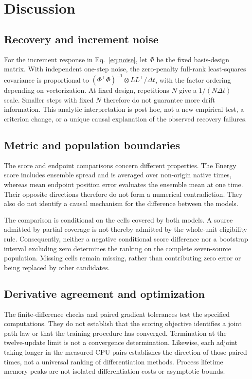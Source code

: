 \documentclass[11pt]{article}
\begin{document}
\section{Discussion}\label{sec:discussion}
\subsection{Recovery and increment noise}
For the increment response in Eq.~\eqref{eq:noise}, let $\Phi$ be the fixed basis-design matrix. With independent one-step noise, the zero-penalty full-rank least-squares covariance is proportional to
$(\Phi^\top\Phi)^{-1}\otimes LL^\top/\Delta t$, with the factor ordering depending on vectorization. At fixed design, repetitions $N$ give a $1/(N\Delta t)$ scale. Smaller steps with fixed $N$ therefore do not guarantee more drift information. This analytic interpretation is post hoc, not a new empirical test, a criterion change, or a unique causal explanation of the observed recovery failures.

\subsection{Metric and population boundaries}
The score and endpoint comparisons concern different properties. The Energy score includes ensemble spread and is averaged over non-origin native times, whereas mean endpoint position error evaluates the ensemble mean at one time. Their opposite directions therefore do not form a numerical contradiction. They also do not identify a causal mechanism for the difference between the models.

The comparison is conditional on the cells covered by both models. A source admitted by partial coverage is not thereby admitted by the whole-unit eligibility rule. Consequently, neither a negative conditional score difference nor a bootstrap interval excluding zero determines the ranking on the complete seven-source population. Missing cells remain missing, rather than contributing zero error or being replaced by other candidates.

\subsection{Derivative agreement and optimization}
The finite-difference checks and paired gradient tolerances test the specified computations. They do not establish that the scoring objective identifies a joint path law or that the training procedure has converged. Termination at the twelve-update limit is not a convergence determination. Likewise, each adjoint taking longer in the measured CPU pairs establishes the direction of those paired times, not a universal ranking of differentiation methods. Process lifetime memory peaks are not isolated differentiation costs or asymptotic bounds.
\end{document}

